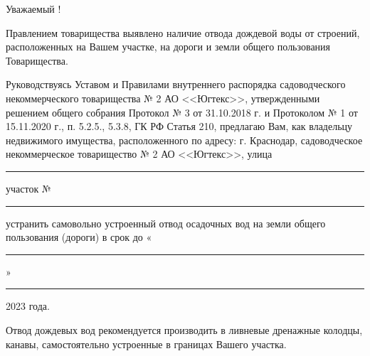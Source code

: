 \begin{center}
	Уважаемый  !
\end{center}
\vspace{-3mm}
Правлением товарищества выявлено наличие  отвода дождевой воды  от строений, расположенных на Вашем участке, на дороги и земли общего пользования  Товарищества.  


Руководствуясь Уставом и  Правилами внутреннего распорядка садоводческого некоммерческого товарищества  № 2 АО <<Югтекс>>, утвержденными решением общего собрания Протокол № 3 от 31.10.2018 г. и Протоколом № 1 от 15.11.2020 г., п. 5.2.5.,  5.3.8,  ГК РФ Статья 210,  предлагаю  Вам, как владельцу недвижимого имущества, расположенного по адресу: г. Краснодар, садоводческое некоммерческое товарищество № 2 АО <<Югтекс>>,    улица \rule{5cm}{0.1 mm} участок №~\rule{15mm}{0.1 mm} устранить самовольно устроенный отвод осадочных вод на  земли общего пользования (дороги) в срок  до «\rule{10mm}{0.1 mm}»\rule{35mm}{0.1 mm} 2023 года.  

Отвод  дождевых вод рекомендуется производить в ливневые дренажные колодцы, канавы, самостоятельно устроенные в границах Вашего участка. 


%



